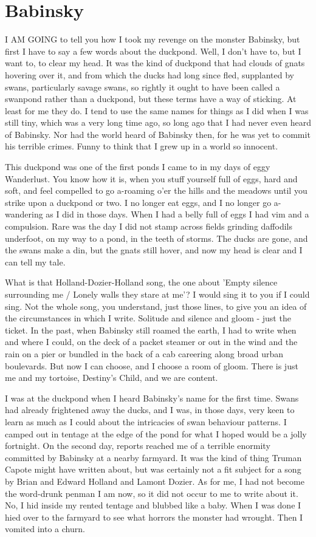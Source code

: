 \chapter{Babinsky}

I AM GOING to tell you how I took my revenge on the monster Babinsky, but first I have to say a few words about the duckpond. Well, I don't have to, but I want to, to clear my head. It was the kind of duckpond that had clouds of gnats hovering over it, and from which the ducks had long since fled, supplanted by swans, particularly savage swans, so rightly it ought to have been called a swanpond rather than a duckpond, but these terms have a way of sticking. At least for me they do. I tend to use the same names for things as I did when I was still tiny, which was a very long time ago, so long ago that I had never even heard of Babinsky. Nor had the world heard of Babinsky then, for he was yet to commit his terrible crimes. Funny to think that I grew up in a world so innocent.

This duckpond was one of the first ponds I came to in my days of eggy Wanderlust. You know how it is, when you stuff yourself full of eggs, hard and soft, and feel compelled to go a-roaming o'er the hills and the meadows until you strike upon a duckpond or two. I no longer eat eggs, and I no longer go a-wandering as I did in those days. When I had a belly full of eggs I had vim and a compulsion. Rare was the day I did not stamp across fields grinding daffodils underfoot, on my way to a pond, in the teeth of storms. The ducks are gone, and the swans make a din, but the gnats still hover, and now my head is clear and I can tell my tale.

What is that Holland-Dozier-Holland song, the one about 'Empty silence surrounding me / Lonely walls they stare at me'? I would sing it to you if I could sing. Not the whole song, you understand, just those lines, to give you an idea of the circumstances in which I write. Solitude and silence and gloom - just the ticket. In the past, when Babinsky still roamed the earth, I had to write when and where I could, on the deck of a packet steamer or out in the wind and the rain on a pier or bundled in the back of a cab careering along broad urban boulevards. But now I can choose, and I choose a room of gloom. There is just me and my tortoise, Destiny's Child, and we are content.

I was at the duckpond when I heard Babinsky's name for the first time. Swans had already frightened away the ducks, and I was, in those days, very keen to learn as much as I could about the intricacies of swan behaviour patterns. I camped out in tentage at the edge of the pond for what I hoped would be a jolly fortnight. On the second day, reports reached me of a terrible enormity committed by Babinsky at a nearby farmyard. It was the kind of thing Truman Capote might have written about, but was certainly not a fit subject for a song by Brian and Edward Holland and Lamont Dozier. As for me, I had not become the word-drunk penman I am now, so it did not occur to me to write about it. No, I hid inside my rented tentage and blubbed like a baby. When I was done I hied over to the farmyard to see what horrors the monster had wrought. Then I vomited into a churn.

